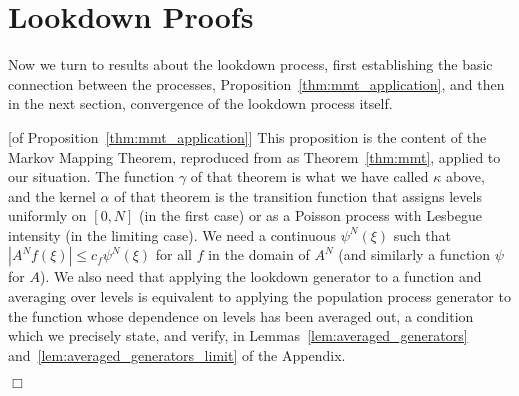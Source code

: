\documentclass[12pt]{article}
\newenvironment {proof}{{\noindent\bf Proof }}{\hfill $\Box$ \medskip}
\newcommand{\lp}{\xi}              %
\numberwithin{equation}{section}
\begin{document}
\section{Lookdown Proofs}
    \label{sec:lookdown_proofs}

Now we turn to results about the lookdown process,
first establishing the basic connection between the processes, Proposition~\ref{thm:mmt_application},
and then in the next section, convergence of the lookdown process itself.

\begin{proof}[of Proposition~\ref{thm:mmt_application}]
    This proposition is the content of the Markov Mapping Theorem,
    reproduced from \citet{etheridge/kurtz:2019} as Theorem~\ref{thm:mmt},
    applied to our situation.
    The function $\gamma$ of that theorem is what we have called $\kappa$ above,
    and the kernel $\alpha$ of that theorem
    is the transition function that assigns levels uniformly on $[0, N]$ (in the first case)
    or as a Poisson process with Lesbegue intensity (in the limiting case).
    We need a continuous $\psi^N(\lp)$ such that $|A^N f(\lp)| \le c_f \psi^N(\lp)$
    for all $f$ in the domain of $A^N$ (and similarly a function $\psi$ for $A$).
    We also need that applying the lookdown generator to a function and averaging over levels
    is equivalent to applying the population process generator to the function
    whose dependence on levels has been averaged out,
    a condition which we precisely state, and verify,
    in Lemmas~\ref{lem:averaged_generators} and~\ref{lem:averaged_generators_limit}
    of the Appendix.


\end{proof}
\end{document}
